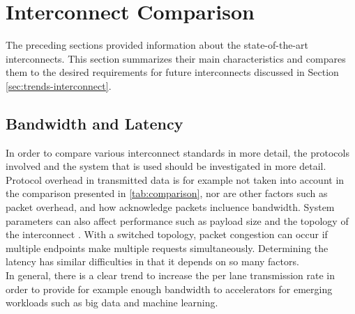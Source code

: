 










\newpage
\section{Interconnect Comparison}
The preceding sections provided information about the state-of-the-art interconnects. This section summarizes their main characteristics and compares them to the desired requirements for future interconnects discussed in Section \ref{sec:trends-interconnect}.



\subsection{Bandwidth and Latency}
In order to compare various interconnect standards in more detail, the protocols involved and the system that is used should be investigated in more detail. Protocol overhead in transmitted data is for example not taken into account in the comparison presented in \autoref{tab:comparison}, nor are other factors such as packet overhead, and how acknowledge packets incluence bandwidth. System parameters can also affect performance such as payload size and the topology of the interconnect \cite{pcie-xilinx}. With a switched topology, packet congestion can occur if multiple endpoints make multiple requests simultaneously. Determining the latency has similar difficulties in that it depends on so many factors.\\
In general, there is a clear trend to increase the per lane transmission rate in order to provide for example enough bandwidth to accelerators for emerging workloads such as big data and machine learning.



